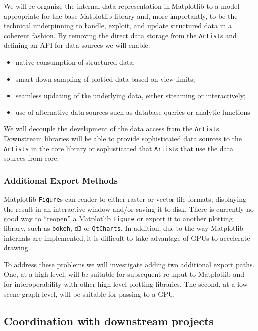 \documentclass[11pt,letterpaper]{article}  %
\begin{document}
We will re-organize the internal data representation in Matplotlib to
a model appropriate for the base Matplotlib library and, more
importantly, to be the technical underpinning to handle, exploit, and
update structured data in a coherent fashion.
By removing the direct data storage from
the \texttt{Artist}s and defining an API for data sources we will enable:
\begin{itemize}[noitemsep]
  \item native consumption of structured data;
  \item smart down-sampling of plotted data based on view limits;
  \item seamless updating of the underlying data, either
    streaming or interactively;
  \item use of alternative data sources such as database queries or analytic functions
\end{itemize}
We will decouple the development of the data access from the
\texttt{Artist}s.  Downstream libraries will be able to provide
sophisticated data sources to the \texttt{Artists} in the core library
or sophisticated that \texttt{Artist}s that use the data sources from
core.


\subsubsection{Additional Export Methods}

Matplotlib \texttt{Figure}s can render to either raster or vector
file formats, displaying the result in an interactive window and/or
saving it to disk. There is
currently no good way to ``reopen'' a Matplotlib \texttt{Figure} or
export it to another plotting library, such as \texttt{bokeh},
\texttt{d3} or \texttt{QtCharts}.  In addition, due to the way Matplotlib
internals are implemented, it is difficult to take advantage of GPUs to
accelerate drawing.

To address these problems we will investigate adding two additional
export paths.  One, at a high-level, will be suitable for subsequent re-input
to Matplotlib
and for interoperability with other high-level plotting
libraries. The second, at a low scene-graph level, will be suitable for passing
to a GPU.


\subsection{Coordination with downstream projects}
\end{document}
